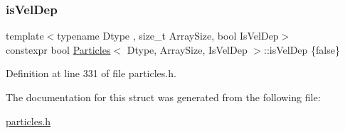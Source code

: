 \subsubsection{\texorpdfstring{is\+Vel\+Dep}{isVelDep}}
{\footnotesize\ttfamily template$<$typename Dtype , size\+\_\+t Array\+Size, bool Is\+Vel\+Dep$>$ \\
constexpr bool \mbox{\hyperlink{struct_particles}{Particles}}$<$ Dtype, Array\+Size, Is\+Vel\+Dep $>$\+::is\+Vel\+Dep \{false\}\hspace{0.3cm}{\ttfamily [static]}}



Definition at line 331 of file particles.\+h.



The documentation for this struct was generated from the following file\+:\begin{DoxyCompactItemize}
\item 
\mbox{\hyperlink{particles_8h}{particles.\+h}}\end{DoxyCompactItemize}
